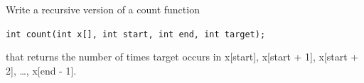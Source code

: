 Write a recursive version of a count function



\verb!int count(int x[], int start, int end, int target);!



that returns the number of times target occurs in x[start], x[start + 1], x[start + 2], \ldots, x[end - 1].

